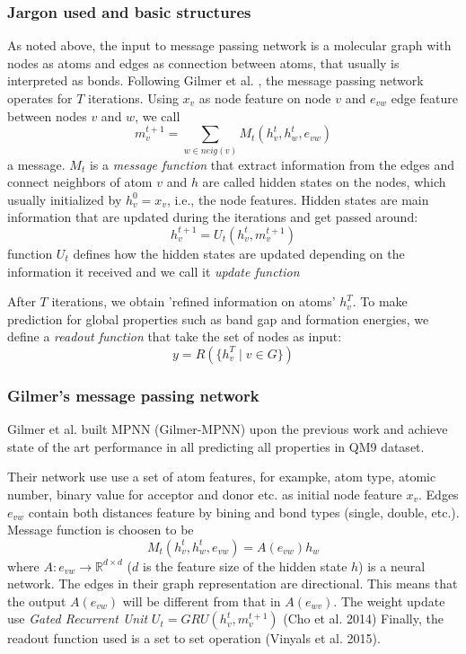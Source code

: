 \documentclass{article}
\begin{document}
\subsubsection{Jargon used and basic structures}
As noted above, the input to message passing network is a molecular graph with nodes as atoms and edges as 
connection between atoms, that usually is interpreted as bonds. 
Following Gilmer et al. \cite{Gilmer}, 
the message passing network operates for $T$ iterations. 
Using $x_v$ as node feature on node $v$ and $e_{vw}$ edge feature between nodes $v$ and $w$, we call
\begin{equation}
    m_{v}^{t+1} = \sum_{w\in neig(v)} M_t(h^t_v, h^t_w, e_{vw})
\end{equation}
a message. $M_t$ is a \emph{message function} that extract information from the edges and connect neighbors of atom $v$ and 
$h$ are called hidden states on the nodes, which usually initialized by $h^0_v = x_v$, i.e., the node features. 
Hidden states are main information that are updated during the iterations and get passed around:
\begin{equation}
    h^{t+1}_v = U_t(h_v^t, m_{v}^{t+1})
\end{equation}
function $U_t$ defines how the hidden states are updated depending on the information it received and we call it 
\emph{update function}

After $T$ iterations, we obtain 'refined information on atoms' $h_v^T$. To make prediction for global properties 
such as band gap and formation energies, we define a \emph{readout function} that take the set of nodes as input:
\begin{equation}
    y = R(\{h_v^T\mid v\in G\})
\end{equation}

\subsubsection{Gilmer's message passing network}
Gilmer et al. built MPNN (Gilmer-MPNN) upon the previous work and achieve state of the art performance in all predicting all properties 
in QM9 dataset. 

Their network use use a set of atom features, for exampke, atom type, atomic number, binary value for acceptor and donor etc. as  
initial node feature $x_v$. Edges $e_{vw}$ contain both distances feature by bining and bond types (single, double, etc.). 
Message function is choosen to be 
\begin{equation}
    M_t(h^t_v, h^t_w, e_{vw}) = A(e_{vw}) h_w
\end{equation}
where $A\colon e_{vw} \to \mathbb{R}^{d\times d}$ ($d$ is the feature size of the hidden state $h$) is a neural network. 
The edges in their graph representation are directional. This means that the output $A(e_{vw})$ will be different from that 
in $A(e_{wv})$. 
The weight update use \emph{Gated Recurrent Unit} $U_t = GRU(h_v^t, m_v^{t+1})$ (Cho et al. 2014)
Finally, the readout function used is a set to set operation (Vinyals et al. 2015).
\end{document}

